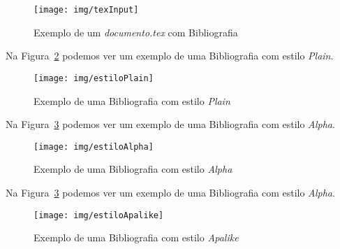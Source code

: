 \documentclass{article}%
\begin{document}
 \begin{figure}[h]
  \centering
  \texttt{[image: img/texInput]}
  \caption{Exemplo de um \emph{documento.tex} com Bibliografia}\label{fig:texInput}
\end{figure}


  Na Figura~\ref{fig:estiloPlain} podemos ver um exemplo de uma Bibliografia com estilo \emph{Plain}.

  \begin{figure}[h]
  \centering
  \texttt{[image: img/estiloPlain]}
  \caption{Exemplo de uma Bibliografia com estilo \emph{Plain}}\label{fig:estiloPlain}
  \end{figure}

  Na Figura~\ref{fig:estiloAlpha} podemos ver um exemplo de uma Bibliografia com estilo \emph{Alpha}.

  \begin{figure}[h]
  \centering
  \texttt{[image: img/estiloAlpha]}
  \caption{Exemplo de uma Bibliografia com estilo \emph{Alpha}}\label{fig:estiloAlpha}
  \end{figure}


  Na Figura~\ref{fig:estiloAlpha} podemos ver um exemplo de uma Bibliografia com estilo \emph{Alpha}.

  \begin{figure}[h]
  \centering
  \texttt{[image: img/estiloApalike]}
  \caption{Exemplo de uma Bibliografia com estilo \emph{Apalike}}\label{fig:estiloApalike}
  \end{figure}
\end{document}
